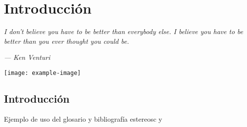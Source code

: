 \newpage 
\chapter*{Introducción}
\epigraph{\textit{I don't believe you have to be better than everybody else. I believe you have to be better than you ever thought you could be.
 		}}{\textit{— Ken Venturi}}
		\vspace*{8cm}
\begin{center}
	 \centering
	\texttt{[image: example-image]}
\end{center}
\thispagestyle{empty}
\newpage
\vspace*{2cm}
\section*{Introducción}

Ejemplo de uso del glosario y bibliografía \gls{estereosc} y \cite{albert2007review}
\blindtext[1]
\blindmathpaper \blindmathpaper



\thispagestyle{empty}	
